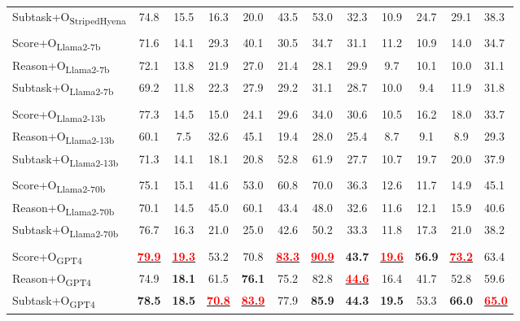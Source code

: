 \documentclass[11pt]{article}
\begin{document}
\begin{table}
\begin{tabular}{l cc | cc | cc | cc | cc | C{1.5cm}}
Subtask+O\textsubscript{\scriptsize{StripedHyena}}    &  74.8  &  15.5  &  16.3  &  20.0  &  43.5  &  53.0  &  32.3  &  10.9  &  24.7  &  29.1  &  38.3 \\ 
\\ 
Score+O\textsubscript{\scriptsize{Llama2-7b}}    &  71.6  &  14.1  &  29.3  &  40.1  &  30.5  &  34.7  &  31.1  &  11.2  &  10.9  &  14.0  &  34.7 \\ 
Reason+O\textsubscript{\scriptsize{Llama2-7b}}    &  72.1  &  13.8  &  21.9  &  27.0  &  21.4  &  28.1  &  29.9  &  9.7  &  10.1  &  10.0  &  31.1 \\ 
Subtask+O\textsubscript{\scriptsize{Llama2-7b}}    &  69.2  &  11.8  &  22.3  &  27.9  &  29.2  &  31.1  &  28.7  &  10.0  &  9.4  &  11.9  &  31.8 \\ 
\\ 
Score+O\textsubscript{\scriptsize{Llama2-13b}}    &  77.3  &  14.5  &  15.0  &  24.1  &  29.6  &  34.0  &  30.6  &  10.5  &  16.2  &  18.0  &  33.7 \\ 
Reason+O\textsubscript{\scriptsize{Llama2-13b}}    &  60.1  &  7.5  &  32.6  &  45.1  &  19.4  &  28.0  &  25.4  &  8.7  &  9.1  &  8.9  &  29.3 \\ 
Subtask+O\textsubscript{\scriptsize{Llama2-13b}}    &  71.3  &  14.1  &  18.1  &  20.8  &  52.8  &  61.9  &  27.7  &  10.7  &  19.7  &  20.0  &  37.9 \\ 
\\ 
Score+O\textsubscript{\scriptsize{Llama2-70b}}    &  75.1  &  15.1  &  41.6  &  53.0  &  60.8  &  70.0  &  36.3  &  12.6  &  11.7  &  14.9  &  45.1 \\ 
Reason+O\textsubscript{\scriptsize{Llama2-70b}}    &  70.1  &  14.5  &  45.0  &  60.1  &  43.4  &  48.0  &  32.6  &  11.6  &  12.1  &  15.9  &  40.6 \\ 
Subtask+O\textsubscript{\scriptsize{Llama2-70b}}    &  76.7  &  16.3  &  21.0  &  25.0  &  42.6  &  50.2  &  33.3  &  11.8  &  17.3  &  21.0  &  38.2 \\ 
\\ 
Score+O\textsubscript{\scriptsize{GPT4}}    &  \underline{\textcolor{red}{\textbf{79.9}}}  &  \underline{\textcolor{red}{\textbf{19.3}}}  &  53.2  &  70.8  &  \underline{\textcolor{red}{\textbf{83.3}}}  &  \underline{\textcolor{red}{\textbf{90.9}}}  &  \textbf{43.7}  &  \underline{\textcolor{red}{\textbf{19.6}}}  &  \textbf{56.9}  &  \underline{\textcolor{red}{\textbf{73.2}}}  &  63.4 \\ 
Reason+O\textsubscript{\scriptsize{GPT4}}    &  74.9  &  \textbf{18.1}  &  61.5  &  \textbf{76.1}  &  75.2  &  82.8  &  \underline{\textcolor{red}{\textbf{44.6}}}  &  16.4  &  41.7  &  52.8  &  59.6 \\ 
Subtask+O\textsubscript{\scriptsize{GPT4}}    &  \textbf{78.5}  &  \textbf{18.5}  & \underline{\textcolor{red}{\textbf{70.8}}} &  \underline{\textcolor{red}{\textbf{83.9}}} &  77.9 &  \textbf{85.9} &  \textbf{44.3} &  \textbf{19.5} &  53.3  &  \textbf{66.0} &  \underline{\textcolor{red}{\textbf{65.0}}}\\ 
\bottomrule


\end{tabular}
\end{table}
\end{document}
